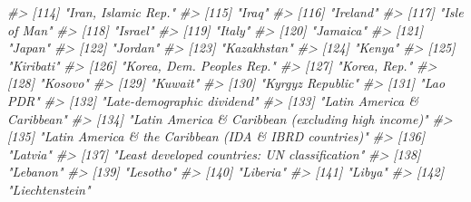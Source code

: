 \documentclass[
  xelatex, ja=standard]{bxjsbook}
\newenvironment{Shaded}{\begin{snugshade}}{\end{snugshade}}
\newcommand{\CommentTok}[1]{\textcolor[rgb]{0.56,0.35,0.01}{\textit{#1}}}
\theoremstyle{definition}
\theoremstyle{definition}
\theoremstyle{definition}
\theoremstyle{definition}
\theoremstyle{remark}
\begin{document}
\begin{Shaded}
\begin{Highlighting}[]
\CommentTok{\#\textgreater{} [114] "Iran, Islamic Rep."                                  }
\CommentTok{\#\textgreater{} [115] "Iraq"                                                }
\CommentTok{\#\textgreater{} [116] "Ireland"                                             }
\CommentTok{\#\textgreater{} [117] "Isle of Man"                                         }
\CommentTok{\#\textgreater{} [118] "Israel"                                              }
\CommentTok{\#\textgreater{} [119] "Italy"                                               }
\CommentTok{\#\textgreater{} [120] "Jamaica"                                             }
\CommentTok{\#\textgreater{} [121] "Japan"                                               }
\CommentTok{\#\textgreater{} [122] "Jordan"                                              }
\CommentTok{\#\textgreater{} [123] "Kazakhstan"                                          }
\CommentTok{\#\textgreater{} [124] "Kenya"                                               }
\CommentTok{\#\textgreater{} [125] "Kiribati"                                            }
\CommentTok{\#\textgreater{} [126] "Korea, Dem. People\textquotesingle{}s Rep."                           }
\CommentTok{\#\textgreater{} [127] "Korea, Rep."                                         }
\CommentTok{\#\textgreater{} [128] "Kosovo"                                              }
\CommentTok{\#\textgreater{} [129] "Kuwait"                                              }
\CommentTok{\#\textgreater{} [130] "Kyrgyz Republic"                                     }
\CommentTok{\#\textgreater{} [131] "Lao PDR"                                             }
\CommentTok{\#\textgreater{} [132] "Late{-}demographic dividend"                           }
\CommentTok{\#\textgreater{} [133] "Latin America \& Caribbean"                           }
\CommentTok{\#\textgreater{} [134] "Latin America \& Caribbean (excluding high income)"   }
\CommentTok{\#\textgreater{} [135] "Latin America \& the Caribbean (IDA \& IBRD countries)"}
\CommentTok{\#\textgreater{} [136] "Latvia"                                              }
\CommentTok{\#\textgreater{} [137] "Least developed countries: UN classification"        }
\CommentTok{\#\textgreater{} [138] "Lebanon"                                             }
\CommentTok{\#\textgreater{} [139] "Lesotho"                                             }
\CommentTok{\#\textgreater{} [140] "Liberia"                                             }
\CommentTok{\#\textgreater{} [141] "Libya"                                               }
\CommentTok{\#\textgreater{} [142] "Liechtenstein"                                       }

\end{Highlighting}
\end{Shaded}
\end{document}
